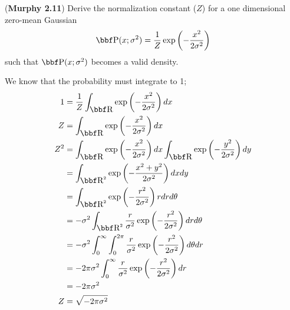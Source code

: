 \documentclass[12pt,letterpaper]{hmcpset}
\begin{document}
\begin{problem}[2]
	(\textbf{Murphy 2.11})
	Derive the normalization constant ($Z$) for a one dimensional
	zero-mean Gaussian
	\[
	\PP(x; \sigma^2) = \frac{1}{Z}\exp\left(-\frac{x^2}{2\sigma^2}\right)
	\]
	such that $\PP(x; \sigma^2)$ becomes a valid density.
\end{problem}
\begin{solution}
We know that the probability must integrate to 1; 
	\begin{align*}
	 1&=\frac{1}{Z} \int_ {\RR}\exp\left(-\frac{x^2}{2\sigma^2}\right)dx \\
	 Z &=  \int_ {\RR}\exp\left(-\frac{x^2}{2\sigma^2}\right)dx\\
	  Z^2&=  \int_ {\RR}\exp\left(-\frac{x^2}{2\sigma^2}\right)dx  \int_ {\RR}\exp\left(-\frac{y^2}{2\sigma^2}\right)dy\\
	  &= \int_{\RR^2} \exp\left(- \frac{x^2+y^2}{2\sigma^2}\right) dx  dy\\
	  &= \int_{\RR^2} \exp \left(-\frac{r^2}{2\sigma^2}\right)rdrd\theta\\
	  &=-\sigma ^2 \int_{\RR^2} \frac{r}{\sigma^2}\exp \left(-\frac{r^2}{2\sigma^2}\right)drd\theta\\
	  &= -\sigma^2\int_0^{\infty}\int_0^{2\pi} \frac{r}{\sigma^2}\exp \left(-\frac{r^2}{2\sigma^2}\right)d\theta dr\\
	  &=-2\pi\sigma^2\int_0^{\infty} \frac{r}{\sigma^2}\exp \left(-\frac{r^2}{2\sigma^2}\right)dr\\
	  &= -2\pi\sigma^2\\
	  Z&= \sqrt{-2\pi\sigma^2}	
	\end{align*}
\end{solution}
\newpage
\end{document}
